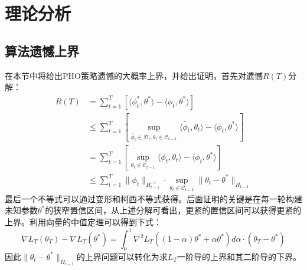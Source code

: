 \documentclass[UTF8,a4paper,10.5pt]{ctexart}
\newcommand{\Ccal}{\mathcal C}
\newcommand{\Dcal}{\mathcal D}
\begin{document}
\section{理论分析}
\subsection{算法遗憾上界}
在本节中将给出PHO策略遗憾的大概率上界，并给出证明，首先对遗憾$R(T)$分解：
\begin{align}
	R(T) &= \sum_{t=1}^T \left[ \langle \phi^*_t,\theta^*\rangle - \langle \phi_t, \theta^* \rangle \right] \nonumber \\
	& \leq \sum_{t=1}^T \left[ \sup_{\tilde{\phi_t}\in \Dcal_t, \theta_t \in \Ccal_{t-1}}\langle \tilde{\phi_t},\theta_t\rangle - \langle \phi_t, \theta^* \rangle \right] \nonumber \\
	& = \sum_{t=1}^T \left[ \sup_{\theta_t \in \Ccal_{t-1}}\langle \phi_t,\theta_t\rangle - \langle \phi_t, \theta^* \rangle \right] \nonumber \\
	& \leq \sum_{t=1}^T \|\phi_t\|_{H_{t-1}^{-1}}\cdot \sup_{\theta_t \in \Ccal_{t-1}}\|\theta_t - \theta^*\|_{H_{t-1}}
	\label{RT_decomp}
\end{align}
最后一个不等式可以通过变形和柯西不等式获得。后面证明的关键是在每一轮构建未知参数$\theta^*$的狭窄置信区间，从上述分解可看出，更紧的置信区间可以获得更紧的上界。利用向量的中值定理可以得到下式：
\begin{equation}
	\nabla L_T(\theta_T) - \nabla L_T(\theta^*) = \int_0^1\nabla^2L_T((1-\alpha)\theta^* + \alpha\theta^*)d\alpha \cdot (\theta_T-\theta^*)
	\label{mean value theorem}
\end{equation}
因此$\|\theta_t - \theta^*\|_{H_{t-1}}$的上界问题可以转化为求$L_T$一阶导的上界和其二阶导的下界。
\end{document}

